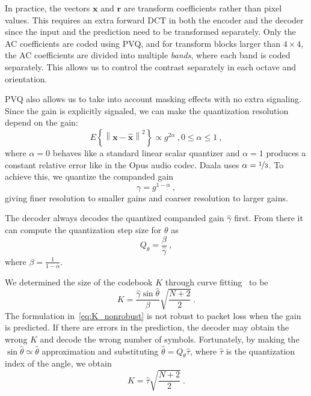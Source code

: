 \documentclass[english,conference,10pt]{IEEEtran}
\begin{document}
In practice, the vectors $\mathbf{x}$ and $\mathbf{r}$ are transform
coefficients rather than pixel values. This requires an extra forward DCT
in both the encoder and the decoder since the input and the prediction need
to be transformed separately. Only the AC coefficients are coded using PVQ,
and for transform blocks larger than $4\times 4$, the AC coefficients are divided into multiple
\textit{bands}, where each band is coded separately. This allows us
to control the contrast separately in each octave and orientation.

PVQ also allows us to take into account masking effects with no
extra signaling. Since the gain is explicitly signaled, we can make
the quantization resolution depend on the gain:
\begin{equation}
E\left\lbrace \left\| \mathbf{x} - \hat{\mathbf{x}} \right\|^2 \right\rbrace
\propto g^{2\alpha}\ , 0 \leq \alpha \leq 1\ ,
\end{equation}
where $\alpha=0$ behaves like a standard linear scalar quantizer and
$\alpha=1$ produces a constant relative error like in the Opus audio codec.
Daala uses $\alpha = \nicefrac{1}{3}$. To achieve this, we quantize the
companded gain
\begin{equation}
\gamma = g^{1-\alpha}\ ,
\end{equation}
giving finer resolution to smaller gains and coarser resolution to larger
gains.

The decoder always decodes the quantized companded gain $\hat{\gamma}$
first. From there it can compute the quantization step size for $\theta$ as
\begin{equation}
Q_\theta = \frac{\beta}{\hat{\gamma}}\ ,
\end{equation}
where $\beta = \frac{1}{1-\alpha}$.

We determined the size of the codebook $K$ through curve
fitting~\cite{valin2015spie} to be
\begin{equation}
K = \frac{\hat{\gamma}\sin\hat{\theta}}{\beta}\sqrt{\frac{N+2}{2}}\ .
\label{eq:K_nonrobust}
\end{equation}
The formulation in~\cref{eq:K_nonrobust} is not robust to packet loss when
the gain is predicted. If there are errors in the prediction, the decoder may
obtain the wrong $K$ and decode the wrong number of symbols. Fortunately, by making the $\sin{\hat{\theta}}
\simeq \hat{\theta}$ approximation and substituting $\hat{\theta} =
Q_\theta\hat{\tau}$, where $\hat{\tau}$ is the quantization index of the angle, we obtain
\begin{equation}
K = \hat{\tau} \sqrt{\frac{N+2}{2}}\ .
\end{equation}
\end{document}
